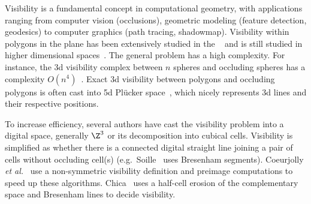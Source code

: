     Visibility is a fundamental concept in computational geometry,
    with applications ranging from computer vision (occlusions),
    geometric modeling (feature detection, geodesics) to computer
    graphics (path tracing, shadowmap). Visibility within polygons in
    the plane has been extensively studied in the
    ~\cite{ghosh:2007-book} and is still studied in higher
    dimensional spaces~\cite{orourke:2017-book}. The general problem
    has a high complexity. For instance, the 3d visibility complex
    between $n$ spheres and occluding spheres has a complexity
    $O(n^4)$~\cite{durand:2002-tog}. Exact 3d visibility between
    polygons and occluding polygons is often cast into 5d Plücker
    space~\cite{nirenstein:2002-ewr}, which nicely represents 3d lines
    and their respective positions. 

    To increase efficiency, several authors have cast the
    visibility problem into a digital space, generally $\Z^3$ or its
    decomposition into cubical cells. Visibility is simplified as
    whether there is a connected digital straight line
    joining a pair of cells without occluding cell(s)
    (e.g.\ Soille~\cite{soille:1994-prl} uses Bresenham
    segments). Coeurjolly \emph{et al.}~\cite{coeurjolly:2004-prl}
    use a non-symmetric visibility definition and preimage
    computations to speed up these
    algorithms. Chica~\cite{chica:2008-spm} uses a half-cell erosion
    of the complementary space and Bresenham lines to decide
    visibility.

